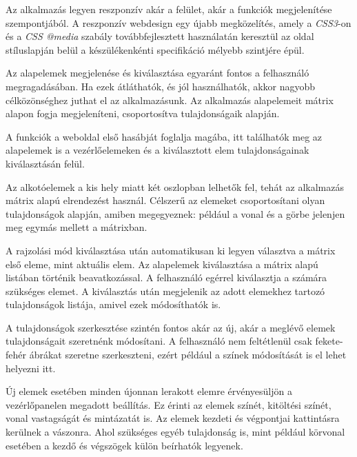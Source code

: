 Az alkalmazás legyen reszponzív akár a felület, akár a funkciók megjelenítése szempontjából. A reszponzív webdesign egy újabb megközelítés, amely a \textit{CSS3}-on és a \textit{CSS @media} \cite{css3media} szabály továbbfejlesztett használatán keresztül az oldal stíluslapján belül a készülékenkénti specifikáció mélyebb szintjére épül.


Az alapelemek megjelenése és kiválasztása egyaránt fontos a felhasználó megragadásában. Ha ezek átláthatók, és jól használhatók, akkor nagyobb célközönséghez juthat el az alkalmazásunk. Az alkalmazás alapelemeit mátrix alapon fogja megjeleníteni, csoportosítva tulajdonságaik alapján.


A funkciók a weboldal első hasábját foglalja magába, itt találhatók meg az alapelemek is a vezérlőelemeken és a kiválasztott elem tulajdonságainak kiválasztásán felül.  

Az alkotóelemek a kis hely miatt két oszlopban lelhetők fel, tehát az alkalmazás mátrix alapú elrendezést használ. Célszerű az elemeket csoportosítani olyan tulajdonságok alapján, amiben megegyeznek: például a vonal és a görbe jelenjen meg egymás mellett a mátrixban. 


A rajzolási mód kiválasztása után automatikusan ki legyen választva a mátrix első eleme, mint aktuális elem. Az alapelemek kiválasztása a mátrix alapú listában történik beavatkozással. A felhasználó egérrel kiválasztja a számára szükséges elemet. A kiválasztás után megjelenik az adott elemekhez tartozó tulajdonságok listája, amivel ezek módosíthatók is.


A tulajdonságok szerkesztése szintén fontos akár az új, akár a meglévő elemek tulajdonságait szeretnénk módosítani. A felhasználó nem feltétlenül csak fekete-fehér ábrákat szeretne szerkeszteni, ezért például a színek módosítását is el lehet helyezni itt.


Új elemek esetében minden újonnan lerakott elemre érvényesüljön a vezérlőpanelen megadott beállítás. Ez érinti az elemek színét, kitöltési színét, vonal vastagságát és mintázatát is. Az elemek kezdeti és végpontjai kattintásra kerülnek a vászonra. Ahol szükséges egyéb tulajdonság is, mint például körvonal esetében a kezdő és végszögek külön beírhatók legyenek.

